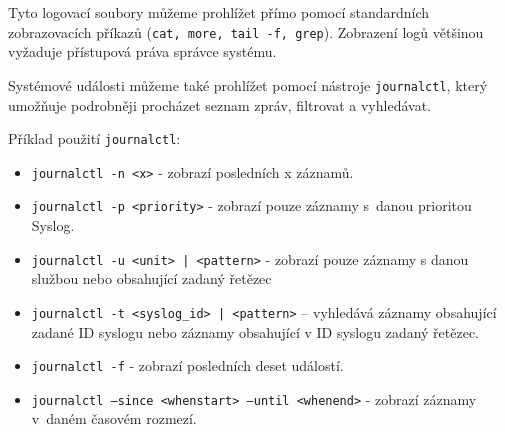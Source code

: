 Tyto logovací soubory můžeme prohlížet přímo pomocí standardních zobrazovacích příkazů ({\tt cat, more, tail -f, grep}). Zobrazení logů většinou vyžaduje přístupová práva správce systému. 

Systémové události můžeme také prohlížet pomocí nástroje \texttt{journalctl}, který umožňuje podrobněji procházet seznam zpráv, filtrovat a vyhledávat.

Příklad použití \texttt{journalctl}:
\begin{itemize}
  \item \texttt{journalctl -n <x>} - zobrazí posledních x záznamů.
  \item \texttt{journalctl -p <priority>} - zobrazí pouze záznamy s~danou prioritou Syslog.
  \item \texttt{journalctl -u <unit> | <pattern>} - zobrazí pouze záznamy s danou službou nebo obsahující zadaný řetězec
  \item \texttt{journalctl -t <syslog\_id> | <pattern>} -- vyhledává záznamy obsahující zadané ID syslogu nebo záznamy obsahující v ID syslogu zadaný řetězec.
  \item \texttt{journalctl -f} - zobrazí posledních deset událostí.
  \item \texttt{journalctl --since <whenstart> --until <whenend>} - zobrazí záznamy v~daném časovém rozmezí.
\end{itemize}





